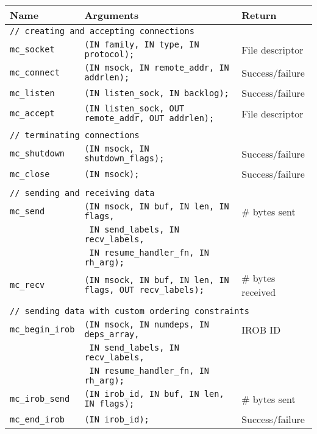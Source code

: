 \documentclass[10pt]{article}
\begin{document}
\begin{figure*}[t]
\begin{small}
\begin{center}
\begin{tabular}{|lll|} \hline
{\bf Name} & {\bf Arguments} & {\bf Return} \\
\hline
\multicolumn{3}{|l|}{\tt // creating and accepting connections} \\
{\tt mc\_socket} & {\tt (IN family, IN type, IN protocol);} & File descriptor\\
{\tt mc\_connect} & {\tt (IN msock, IN remote\_addr, IN addrlen); } & Success/failure\\
{\tt mc\_listen} & {\tt (IN listen\_sock, IN backlog); } & Success/failure\\
{\tt mc\_accept} & {\tt (IN listen\_sock, OUT remote\_addr, OUT addrlen); } & File descriptor\\
& & \\
\multicolumn{3}{|l|}{\tt // terminating connections} \\
{\tt mc\_shutdown} & {\tt (IN msock, IN shutdown\_flags);} & Success/failure\\
{\tt mc\_close} & {\tt (IN msock);} & Success/failure\\
& & \\
\multicolumn{3}{|l|}{\tt // sending and receiving data} \\
{\tt mc\_send} & {\tt (IN msock, IN buf, IN len, IN flags, }& \# bytes sent\\
               & {\tt ~IN send\_labels, IN recv\_labels,}& \\
               & {\tt ~IN resume\_handler\_fn, IN rh\_arg); } & \\
{\tt mc\_recv} & {\tt (IN msock, IN buf, IN len, IN flags, OUT recv\_labels);}& \# bytes received\\
 & & \\
\multicolumn{3}{|l|}{\tt // sending data with custom ordering constraints} \\
{\tt mc\_begin\_irob} & {\tt (IN msock, IN numdeps, IN deps\_array,}& IROB ID \\
                      & {\tt ~IN send\_labels, IN recv\_labels,}& \\ 
                      & {\tt ~IN resume\_handler\_fn, IN rh\_arg); } & \\
{\tt mc\_irob\_send} & {\tt (IN irob\_id, IN buf, IN len, IN flags);} & \# bytes sent \\
{\tt mc\_end\_irob} & {\tt (IN irob\_id); }&  Success/failure\\

\end{tabular}
\end{center}
\end{small}
\end{figure*}
\end{document}
